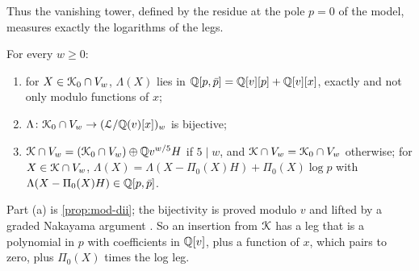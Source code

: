 Thus the vanishing tower, defined by the residue at the pole $p=0$ of the model, measures exactly the logarithms of the legs.

\begin{thm}
\label{thm:mod-lattice}
For every $w\geq0$:
\begin{enumerate}
\item[(a)] for $X\in\mathcal{K}_{0}\cap V_w$, $\Lambda(X)$ lies in $\mathbb{Q}[p,\bar p]=\mathbb{Q}[v][p]+\mathbb{Q}[v][x]$, exactly and not only modulo functions of $x$;
\item[(b)] $\Lambda\colon\mathcal{K}_{0}\cap V_w\to(\mathcal{L}/\mathbb{Q}(v)[x])_w$ is bijective;
\item[(c)] $\mathcal{K}\cap V_w=(\mathcal{K}_{0}\cap V_w)\oplus\mathbb{Q} v^{w/5}H$ if $5\mid w$, and $\mathcal{K}\cap V_w=\mathcal{K}_{0}\cap V_w$ otherwise; for $X\in\mathcal{K}\cap V_w$, $\Lambda(X)=\Lambda(X-\Pi_0(X)H)+\Pi_0(X)\log p$ with $\Lambda(X-\Pi_0(X)H)\in\mathbb{Q}[p,\bar p]$.
\end{enumerate}

\end{thm}

Part (a) is \cref{prop:mod-dii}; the bijectivity is proved modulo $v$ and lifted by a graded Nakayama argument . So an insertion from $\mathcal{K}$ has a leg that is a polynomial in $p$ with coefficients in $\mathbb{Q}[v]$, plus a function of $x$, which pairs to zero, plus $\Pi_0(X)$ times the log leg.


